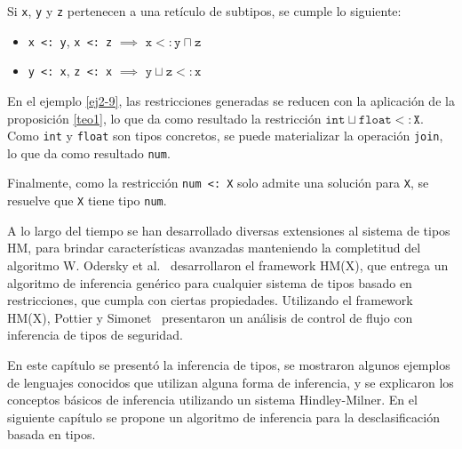 \begin{prop} \label{teo1} \normalfont Si \texttt{x}, \texttt{y} y \texttt{z} pertenecen a una retículo de subtipos, se cumple lo siguiente:
  \begin{itemize}
    \item \texttt{x <: y}, \texttt{x <: z} $\implies$ $\mathtt{x <: y \sqcap z}$
    \item \texttt{y <: x}, \texttt{z <: x} $\implies$ $\mathtt{y \sqcup z <: x}$
  \end{itemize}
\end{prop}

En el ejemplo \ref{ej2-9}, las restricciones generadas se reducen con la aplicación de la proposición \ref{teo1}, lo que da como resultado la restricción $\mathtt{int\sqcup float <: X}$. Como \texttt{int} y \texttt{float} son tipos concretos, se puede materializar la operación \texttt{join}, lo que da como resultado \texttt{num}.

Finalmente, como la restricción \texttt{num <: X} solo admite una solución para \texttt{X}, se resuelve que \texttt{X} tiene tipo \texttt{num}.

A lo largo del tiempo se han desarrollado diversas extensiones al sistema de tipos HM, para brindar características avanzadas manteniendo la completitud del algoritmo W. Odersky et al.~\cite{odersky} desarrollaron el framework HM(X), que entrega un algoritmo de inferencia genérico para cualquier sistema de tipos basado en restricciones, que cumpla con ciertas propiedades. Utilizando el framework HM(X), Pottier y Simonet~\cite{Pottier} presentaron un análisis de control de flujo con inferencia de tipos de seguridad.

En este capítulo se presentó la inferencia de tipos, se mostraron algunos ejemplos de lenguajes conocidos que utilizan alguna forma de inferencia, y se explicaron los conceptos básicos de inferencia utilizando un sistema Hindley-Milner. En el siguiente capítulo se propone un algoritmo de inferencia para la desclasificación basada en tipos.

